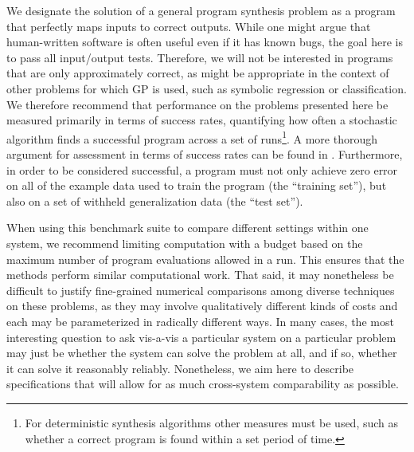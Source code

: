 \documentclass{sig-alternate}
\begin{document}
We designate the solution of a general program synthesis problem as a program that perfectly maps inputs to correct outputs. While one might argue that human-written software is often useful even if it has known bugs, the goal here is to pass all input/output tests. Therefore, we will not be interested in programs that are only approximately correct, as might be appropriate in the context of other problems for which GP is used, such as symbolic regression or classification. We therefore recommend that performance on the problems presented here be measured primarily in terms of success rates, quantifying how often a stochastic algorithm finds a successful program across a set of runs\footnote{For deterministic synthesis algorithms other measures must be used, such as whether a correct program is found within a set period of time.}. A more thorough argument for assessment in terms of success rates can be found in \cite{Helmuth:2014:GECCO}.
Furthermore, in order to be considered successful, a program must not only achieve zero error on all of the example data used to train the program (the ``training set''), but also on a set of withheld generalization data (the ``test set''). 





When using this benchmark suite to compare different settings within one system, we recommend limiting computation with a budget based on the maximum number of program evaluations allowed in a run. This ensures that the methods perform similar computational work. That said, it may nonetheless be difficult to justify fine-grained numerical comparisons among diverse techniques on these problems, as they may involve qualitatively different kinds of costs and each may be parameterized in radically different ways. In many cases, the most interesting question to ask vis-a-vis a particular system on a particular problem may just be whether the system can solve the problem at all, and if so,  whether it can solve it reasonably reliably. Nonetheless, we aim here to describe specifications that will allow for as much cross-system comparability as possible. %
\end{document}
